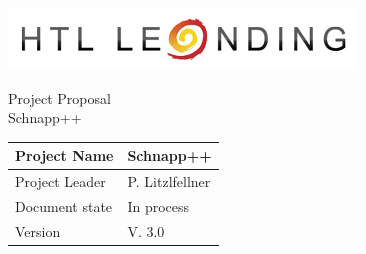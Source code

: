 \documentclass[12pt]{article}
\theoremstyle{definition}
\newcommand{\projectname}{Schnapp++}
\newcommand{\productname}{Schnapp++}
\newcommand{\projectleader}{P. Litzlfellner}
\newcommand{\documentstatus}{In process}
\newcommand{\version}{V. 3.0}
\begin{document}
\begin{titlepage}
\begin{flushright}
\includegraphics[scale=.5]{./htlleondinglogo.png}\\
\end{flushright}

\vspace{10em}

\begin{center}
{\Huge Project Proposal} \\[3em]
{\LARGE \productname} \\[3em]
\end{center}

\begin{flushleft}
\begin{tabular}{|l|l|}
\hline
Project Name & \projectname \\ \hline
Project Leader & \projectleader \\ \hline
Document state & \documentstatus \\ \hline
Version & \version \\ \hline
\end{tabular}
\end{flushleft}

\end{titlepage}
\end{document}
